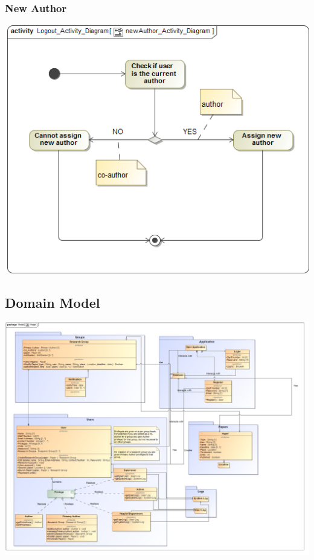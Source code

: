 \documentclass[11pt]{article}
\begin{document}
	\newpage
	\subsubsection{New Author}
	\begin{center}
		\includegraphics[width=\textwidth]{../Images/newAuthor_Activity_Diagram.png}\\[0.5cm]
	\end{center}
	
	\subsection{Domain Model}
	\begin{center}
		\includegraphics[width=\textwidth]{../DomainModel/Model.png}\\[0.5cm]
	\end{center}
	
\end{document}
